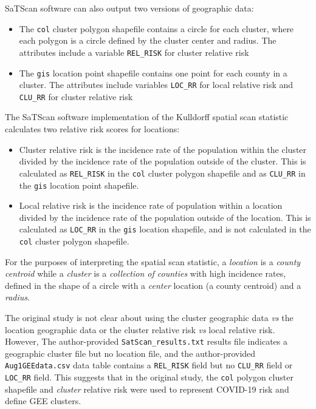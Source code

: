 \documentclass[
]{article}
\providecommand{\tightlist}{%
  \setlength{\itemsep}{0pt}\setlength{\parskip}{0pt}}
\begin{document}
SaTScan software can also output two versions of geographic data:

\begin{itemize}
\tightlist
\item
  The \texttt{col} cluster polygon shapefile contains a circle for each
  cluster, where each polygon is a circle defined by the cluster center
  and radius. The attributes include a variable \texttt{REL\_RISK} for
  cluster relative risk
\item
  The \texttt{gis} location point shapefile contains one point for each
  county in a cluster. The attributes include variables \texttt{LOC\_RR}
  for local relative risk and \texttt{CLU\_RR} for cluster relative risk
\end{itemize}

The SaTScan software implementation of the Kulldorff spatial scan
statistic calculates two relative risk scores for locations:

\begin{itemize}
\tightlist
\item
  Cluster relative risk is the incidence rate of the population within
  the cluster divided by the incidence rate of the population outside of
  the cluster. This is calculated as \texttt{REL\_RISK} in the
  \texttt{col} cluster polygon shapefile and as \texttt{CLU\_RR} in the
  \texttt{gis} location point shapefile.
\item
  Local relative risk is the incidence rate of population within a
  location divided by the incidence rate of the population outside of
  the location. This is calculated as \texttt{LOC\_RR} in the
  \texttt{gis} location shapefile, and is not calculated in the
  \texttt{col} cluster polygon shapefile.
\end{itemize}

For the purposes of interpreting the spatial scan statistic, a
\emph{location} is a \emph{county centroid} while a \emph{cluster} is a
\emph{collection of counties} with high incidence rates, defined in the
shape of a circle with a \emph{center} location (a county centroid) and
a \emph{radius}.

The original study is not clear about using the cluster geographic data
\emph{vs} the location geographic data or the cluster relative risk
\emph{vs} local relative risk. However, The author-provided
\texttt{SatScan\_results.txt} results file indicates a geographic
cluster file but no location file, and the author-provided
\texttt{Aug1GEEdata.csv} data table contains a \texttt{REL\_RISK} field
but no \texttt{CLU\_RR} field or \texttt{LOC\_RR} field. This suggests
that in the original study, the \texttt{col} polygon cluster shapefile
and \emph{cluster} relative risk were used to represent COVID-19 risk
and define GEE clusters.
\end{document}

